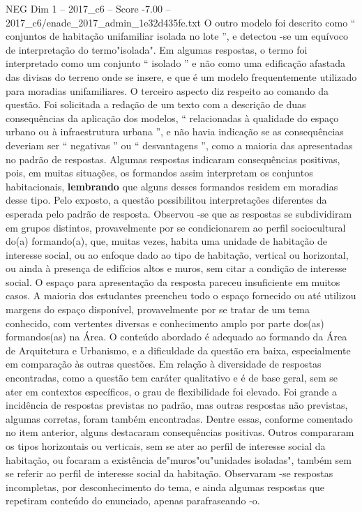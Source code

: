 \begin{textsample}{NEG Dim 1 – 2017\_c6 – Score -7.00 – 2017\_c6/enade\_2017\_admin\_1e32d435fe.txt}
O outro modelo foi descrito como “ conjuntos de habitação unifamiliar isolada no lote ”, e detectou -se um equívoco de interpretação do termo"isolada".
Em algumas respostas, o termo foi interpretado como um conjunto “ isolado ” e não como uma edificação afastada das divisas do terreno onde se insere, e que é um modelo frequentemente utilizado para moradias unifamiliares.
O terceiro aspecto diz respeito ao comando da questão.
Foi solicitada a redação de um texto com a descrição de duas consequências da aplicação dos modelos, “ relacionadas à qualidade do espaço urbano ou à infraestrutura urbana ”, e não havia indicação se as consequências deveriam ser “ negativas ” ou “ desvantagens ”, como a maioria das apresentadas no padrão de respostas.
Algumas respostas indicaram consequências positivas, pois, em muitas situações, os formandos assim interpretam os conjuntos habitacionais, \textbf{lembrando} que alguns desses formandos residem em moradias desse tipo.
Pelo exposto, a questão possibilitou interpretações diferentes da esperada pelo padrão de resposta.
Observou -se que as respostas se subdividiram em grupos distintos, provavelmente por se condicionarem ao perfil sociocultural do(a) formando(a), que, muitas vezes, habita uma unidade de habitação de interesse social, ou ao enfoque dado ao tipo de habitação, vertical ou horizontal, ou ainda à presença de edifícios altos e muros, sem citar a condição de interesse social.
O espaço para apresentação da resposta pareceu insuficiente em muitos casos.
A maioria dos estudantes preencheu todo o espaço fornecido ou até utilizou margens do espaço disponível, provavelmente por se tratar de um tema conhecido, com vertentes diversas e conhecimento amplo por parte dos(as) formandos(as) na Área.
O conteúdo abordado é adequado ao formando da Área de Arquitetura e Urbanismo, e a dificuldade da questão era baixa, especialmente em comparação às outras questões.
Em relação à diversidade de respostas encontradas, como a questão tem caráter qualitativo e é de base geral, sem se ater em contextos específicos, o grau de flexibilidade foi elevado.
Foi grande a incidência de respostas previstas no padrão, mas outras respostas não previstas, algumas corretas, foram também encontradas.
Dentre essas, conforme comentado no item anterior, alguns destacaram consequências positivas.
Outros compararam os tipos horizontais ou verticais, sem se ater ao perfil de interesse social da habitação, ou focaram a existência de"muros"ou"unidades isoladas", também sem se referir ao perfil de interesse social da habitação.
Observaram -se respostas incompletas, por desconhecimento do tema, e ainda algumas respostas que repetiram conteúdo do enunciado, apenas parafraseando -o.

\end{textsample}
